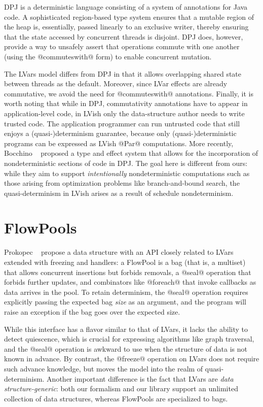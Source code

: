 DPJ \cite{dpj-oopsla, dpj-hotpar09} is a deterministic language
consisting of a system of annotations for Java code.  A sophisticated
region-based type system ensures that a mutable region of the heap is,
essentially, passed linearly to an exclusive writer, thereby ensuring
that the state accessed by concurrent threads is disjoint.  DPJ does,
however, provide a way to unsafely assert that operations commute with
one another (using the @commuteswith@ form) to enable concurrent
mutation.

The LVars model differs from DPJ in that it allows overlapping shared
state between threads as the default.  Moreover, since LVar effects
are already commutative, we avoid the need for @commuteswith@
annotations.  Finally, it is worth noting that while in DPJ,
commutativity annotations have to appear in application-level code, in
LVish only the data-structure author needs to write trusted code. The
application programmer can run untrusted code that still enjoys a
(quasi-)determinism guarantee, because only (quasi-)deterministic
programs can be expressed as LVish @Par@ computations.
More recently, Bocchino \etal~\cite{dpj-popl} proposed a type and
effect system that allows for the incorporation of nondeterministic
sections of code in DPJ.  The goal here is different from ours: while
they aim to support \emph{intentionally} nondeterministic computations
such as those arising from optimization problems like branch-and-bound
search, the quasi-determinism in LVish arises as a result of schedule
nondeterminism.

\section{FlowPools}

Prokopec \etal~\cite{flowpools} propose a data structure with an API
closely related to LVars extended with freezing and handlers: a
FlowPool is a bag (that is, a multiset) that allows concurrent
insertions but forbids removals, a @seal@ operation that forbids
further updates, and combinators like @foreach@ that invoke callbacks
as data arrives in the pool.  To retain determinism, the @seal@
operation requires explicitly passing the expected bag \emph{size} as
an argument, and the program will raise an exception if the bag goes
over the expected size.

While this interface has a flavor similar to that of LVars, it lacks
the ability to detect quiescence, which is crucial for expressing
algorithms like graph traversal, and the @seal@ operation is awkward
to use when the structure of data is not known in advance.  By
contrast, the @freeze@ operation on LVars does not require such
advance knowledge, but moves the model into the realm of
quasi-determinism.  Another important difference is the fact that
LVars are \emph{data structure-generic}: both our formalism and our
library support an unlimited collection of data structures, whereas
FlowPools are specialized to bags.

